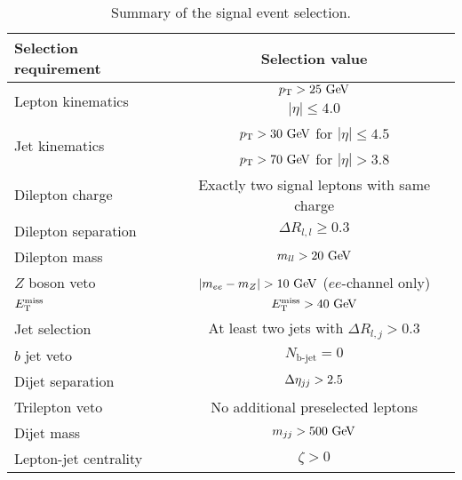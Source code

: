 \begin{table}[htbp]
  \centering
  \begin{tabular}{l|c}
    Selection requirement              & Selection value \\
    \hline\hline
    \multirow{2}{*}{Lepton kinematics} & $\pt > 25\gev$ \\
                                       & $|\eta| \le 4.0$ \\
    \multirow{2}{*}{Jet kinematics}    & $\pt > 30\gev$ for $|\eta| \le 4.5$ \\
                                       & $\pt > 70\gev$ for $|\eta| > 3.8$ \\
    \hline
    Dilepton charge                    & Exactly two signal leptons with same charge\\
    Dilepton separation                & $\Delta R_{l,l} \ge 0.3$ \\
    Dilepton mass                      & $m_{ll} > 20\gev$\\
    $Z$ boson veto                     & $|m_{ee} - m_Z| > 10\gev$ ($ee$-channel only) \\
    $E_{\mathrm{T}}^{\mathrm{miss}}$                             & $\met > 40\gev$ \\
    Jet selection                      & At least two jets with $\Delta R_{l,j} > 0.3$\\
    $b$ jet veto                       & $N_{\textrm{b-jet}} = 0$\\
    Dijet separation                   & $\detajj > 2.5$\\
    Trilepton veto                     & No additional preselected leptons\\
    Dijet mass                         & $m_{jj} > 500\gev$\\
    Lepton-jet centrality              & $\zeta > 0$\\
    \hline
  \end{tabular}
  \caption{Summary of the signal event selection.}
  \label{tab:sswwupgrade_event_selection}
\end{table}
